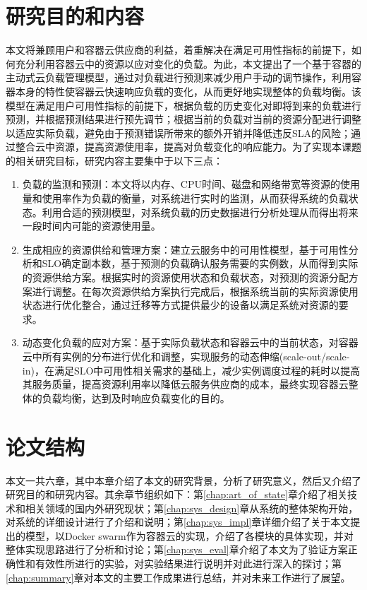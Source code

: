 \section{研究目的和内容}
本文将兼顾用户和容器云供应商的利益，着重解决在满足可用性指标的前提下，如何充分利用容器云中的资源以应对变化的负载。为此，本文提出了一个基于容器的主动式云负载管理模型，通过对负载进行预测来减少用户手动的调节操作，利用容器本身的特性使容器云快速响应负载的变化，从而更好地实现整体的负载均衡。该模型在满足用户可用性指标的前提下，根据负载的历史变化对即将到来的负载进行预测，并根据预测结果进行预先调节；根据当前的负载对当前的资源分配进行调整以适应实际负载，避免由于预测错误所带来的额外开销并降低违反SLA的风险；通过整合云中资源，提高资源使用率，提高对负载变化的响应能力。为了实现本课题的相关研究目标，研究内容主要集中于以下三点：
\begin{enumerate}
\item 负载的监测和预测：本文将以内存、CPU时间、磁盘和网络带宽等资源的使用量和使用率作为负载的衡量，对系统进行实时的监测，从而获得系统的负载状态。利用合适的预测模型，对系统负载的历史数据进行分析处理从而得出将来一段时间内可能的资源使用量。
\item 生成相应的资源供给和管理方案：建立云服务中的可用性模型，基于可用性分析和SLO确定副本数，基于预测的负载确认服务需要的实例数，从而得到实际的资源供给方案。根据实时的资源使用状态和负载状态，对预测的资源分配方案进行调整。在每次资源供给方案执行完成后，根据系统当前的实际资源使用状态进行优化整合，通过迁移等方式提供最少的设备以满足系统对资源的要求。
\item 动态变化负载的应对方案：基于实际负载状态和容器云中的当前状态，对容器云中所有实例的分布进行优化和调整，实现服务的动态伸缩(scale-out/scale-in)，在满足SLO中可用性相关需求的基础上，减少实例调度过程的耗时以提高其服务质量，提高资源利用率以降低云服务供应商的成本，最终实现容器云整体的负载均衡，达到及时响应负载变化的目的。
\end{enumerate}

\section{论文结构}
本文一共六章，其中本章介绍了本文的研究背景，分析了研究意义，然后又介绍了研究目的和研究内容。其余章节组织如下：第\ref{chap:art_of_state}章介绍了相关技术和相关领域的国内外研究现状；第\ref{chap:sys_design}章从系统的整体架构开始，对系统的详细设计进行了介绍和说明；第\ref{chap:sys_impl}章详细介绍了关于本文提出的模型，以Docker swarm作为容器云的实现，介绍了各模块的具体实现，并对整体实现思路进行了分析和讨论；第\ref{chap:sys_eval}章介绍了本文为了验证方案正确性和有效性所进行的实验，对实验结果进行说明并对此进行深入的探讨；第\ref{chap:summary}章对本文的主要工作成果进行总结，并对未来工作进行了展望。